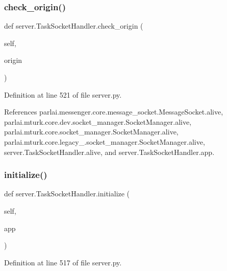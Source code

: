 \subsubsection{\texorpdfstring{check\+\_\+origin()}{check\_origin()}}
{\footnotesize\ttfamily def server.\+Task\+Socket\+Handler.\+check\+\_\+origin (\begin{DoxyParamCaption}\item[{}]{self,  }\item[{}]{origin }\end{DoxyParamCaption})}



Definition at line 521 of file server.\+py.



References parlai.\+messenger.\+core.\+message\+\_\+socket.\+Message\+Socket.\+alive, parlai.\+mturk.\+core.\+dev.\+socket\+\_\+manager.\+Socket\+Manager.\+alive, parlai.\+mturk.\+core.\+socket\+\_\+manager.\+Socket\+Manager.\+alive, parlai.\+mturk.\+core.\+legacy\+\_.\+socket\+\_\+manager.\+Socket\+Manager.\+alive, server.\+Task\+Socket\+Handler.\+alive, and server.\+Task\+Socket\+Handler.\+app.

\mbox{\label{classserver_1_1TaskSocketHandler_a4c5c0fc90924bbdeaf99acb15310e206}} 
\subsubsection{\texorpdfstring{initialize()}{initialize()}}
{\footnotesize\ttfamily def server.\+Task\+Socket\+Handler.\+initialize (\begin{DoxyParamCaption}\item[{}]{self,  }\item[{}]{app }\end{DoxyParamCaption})}



Definition at line 517 of file server.\+py.

\mbox{\label{classserver_1_1TaskSocketHandler_ad4beb88c347e0edec2913d28317e52e1}} 
